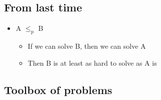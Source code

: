 \documentclass[11pt]{article}
\begin{document}
\subsection{From last time}
\label{sec:orgea3cb25}
\begin{itemize}
\item A \(\le_{\text{p}}\) B
\begin{itemize}
\item If we can solve B, then we can solve A
\item Then B is at least as hard to solve as A is
\end{itemize}
\end{itemize}
\subsection{Toolbox of problems}
\label{sec:orgfa25590}
\end{document}
